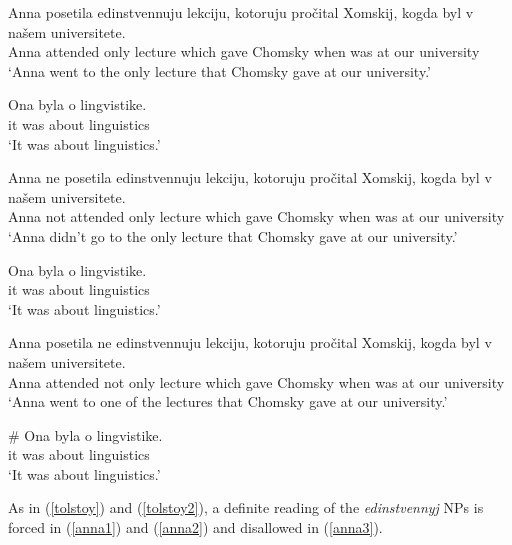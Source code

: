 
\begin{exe}
	\ex \label{anna1} \begin{xlist}
		\ex \gll Anna posetila edinstvennuju lekciju, kotoruju pro\v{c}ital Xomskij, kogda byl v na\v{s}em universitete.\\
		Anna attended only lecture which gave Chomsky when was at our university\\
		\glt `Anna went to the only lecture that Chomsky gave at our university.'

		\ex \gll Ona byla o lingvistike.\\
		it was about linguistics\\
		\glt `It was about linguistics.'
	\end{xlist}

	\ex \label{anna2} \begin{xlist}
		\ex \gll Anna ne posetila edinstvennuju lekciju, kotoruju pro\v{c}ital Xomskij, kogda byl v na\v{s}em universitete.\\
		Anna not attended only lecture which gave Chomsky when was at our university\\
		\glt `Anna didn't go to the only lecture that Chomsky gave at our university.'

		\ex \gll Ona byla o lingvistike.\\
		it was about linguistics\\
		\glt `It was about linguistics.'
	\end{xlist}

	\ex \label{anna3} \begin{xlist}
		\ex \gll Anna posetila ne edinstvennuju lekciju, kotoruju pro\v{c}ital Xomskij, kogda byl v na\v{s}em universitete.\\
		Anna attended not only lecture which gave Chomsky when was at our university\\
		\glt `Anna went to one of the lectures that Chomsky gave at our university.'

		\ex \gll \# Ona byla o lingvistike.\\
		{} it was about linguistics\\
		\glt `It was about linguistics.'
	\end{xlist}
\end{exe}

As in (\ref{tolstoy}) and (\ref{tolstoy2}), a definite reading of the \textit{edinstvennyj} NPs is forced in (\ref{anna1}) and (\ref{anna2}) and disallowed in (\ref{anna3}).

